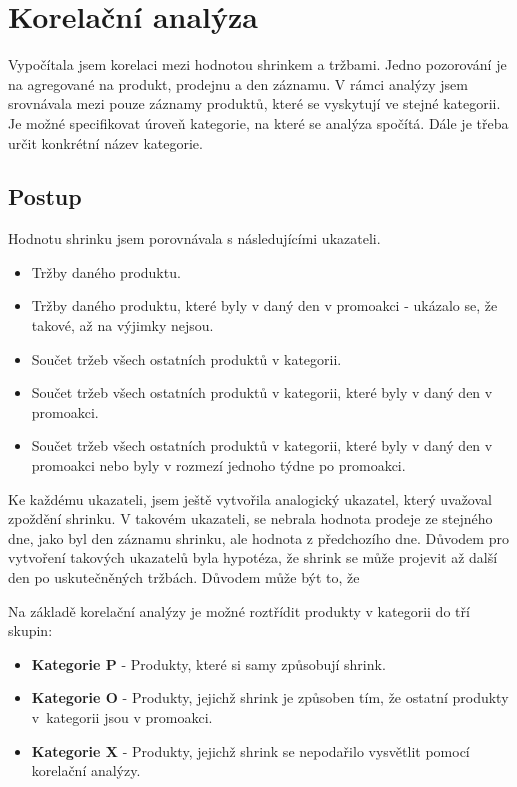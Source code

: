 \newpage
\section{Korelační analýza}

Vypočítala jsem korelaci mezi hodnotou shrinkem a tržbami. Jedno pozorování je na agregované na produkt, prodejnu a den záznamu. 
V rámci analýzy jsem srovnávala mezi pouze záznamy produktů, které se vyskytují ve stejné kategorii. Je možné specifikovat úroveň kategorie, na které se analýza spočítá. Dále je třeba určit konkrétní název kategorie.



\subsection{Postup}

Hodnotu shrinku jsem porovnávala s následujícími ukazateli. 
\begin{itemize}
    \itemsep0em 

    \item Tržby daného produktu.
    \item Tržby daného produktu, které byly v daný den v promoakci - ukázalo se, že takové, až na výjimky nejsou.
    \item Součet tržeb všech ostatních produktů v kategorii.
    \item Součet tržeb všech ostatních produktů v kategorii, které byly v daný den v promoakci.
    \item Součet tržeb všech ostatních produktů v kategorii, které byly v daný den v promoakci nebo byly v rozmezí jednoho týdne po promoakci.
\end{itemize}

Ke každému ukazateli, jsem ještě vytvořila analogický ukazatel, který uvažoval zpoždění shrinku. V takovém ukazateli, se nebrala hodnota prodeje ze stejného dne, jako byl den záznamu shrinku, ale hodnota z předchozího dne. Důvodem pro vytvoření takových ukazatelů byla hypotéza, že shrink se může projevit až další den po uskutečněných tržbách. Důvodem může být to, že 

Na základě korelační analýzy je možné roztřídit produkty v kategorii do tří skupin:
\begin{itemize}
    \itemsep0em 
    \item[] \textbf{Kategorie P} - Produkty, které si samy způsobují shrink.
    \item[] \textbf{Kategorie O} - Produkty, jejichž shrink je způsoben tím, že ostatní produkty v~kategorii jsou v promoakci.
    \item[] \textbf{Kategorie X} - Produkty, jejichž shrink se nepodařilo vysvětlit pomocí korelační analýzy.
\end{itemize}

